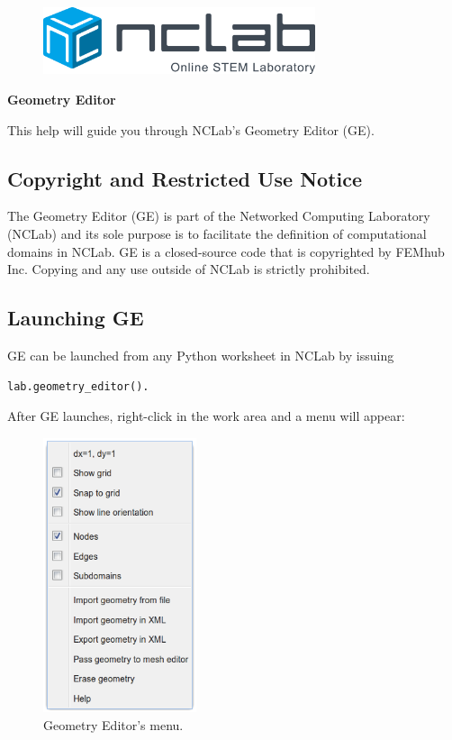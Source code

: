 \documentclass{article}
\begin{document}
\large

\vbox{}
\begin{figure}[!ht]
\includegraphics[width=8cm]{logo.png}
\vspace{4mm}
\end{figure}

\centerline{\huge \bf Geometry Editor}
\vspace{6mm}
\noindent
This help will guide you through NCLab's Geometry Editor (GE).

\subsection*{Copyright and Restricted Use Notice}

The Geometry Editor (GE) is part of the Networked Computing Laboratory (NCLab) and its sole purpose is to facilitate the definition of computational domains in NCLab. GE is a closed-source code that is copyrighted by FEMhub Inc. Copying and any use outside of NCLab is strictly prohibited.

\subsection*{Launching GE}

GE can be launched from any Python worksheet in NCLab by issuing 

\begin{verbatim}
lab.geometry_editor().
\end{verbatim}
After GE launches, right-click in the work area and a menu will appear:\\

\begin{figure}[!ht]
\begin{center}
\includegraphics[width=4.5cm]{ge-menu.png}
\end{center}
\vspace{-4mm}
\caption{Geometry Editor's menu.}
\end{figure}
\end{document}
